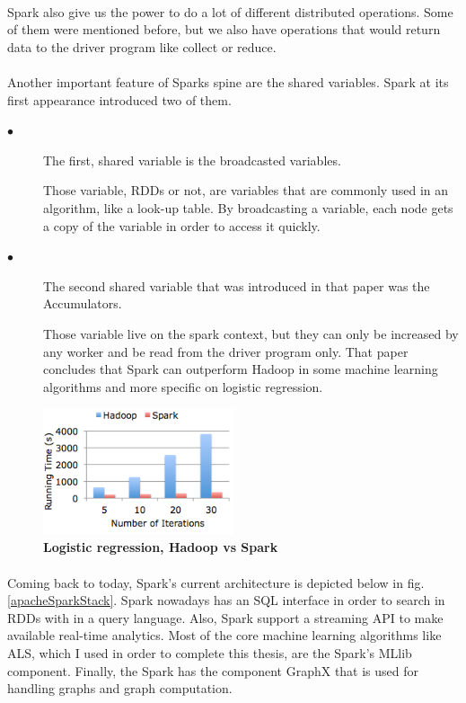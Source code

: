 \paragraph{}Spark also give us the power to do a lot of different distributed operations. Some of them were mentioned before, but we also have operations that would return data to the driver program like collect or reduce. 

\paragraph{}Another important feature of Sparks spine are the shared variables. Spark at its first appearance introduced two of them. 
\begin{description}
	\item[$\bullet$] The first, shared variable is the broadcasted variables. 
	
	Those variable, RDDs or not, are variables that are commonly used in an algorithm, like a look-up table. By broadcasting a variable, each node gets a copy of the variable in order to access it quickly. 
	
	\item[$\bullet$] The second shared variable that was introduced in that paper was the Accumulators. 
	
	Those variable live on the spark context, but they can only be increased by any worker and be read from the driver program only. That paper concludes that Spark can outperform Hadoop in some machine learning algorithms and more specific on logistic regression.
\end{description}

\begin{figure}[ht]
  \centering
    \includegraphics[width=0.5\textwidth]{images/hadoopVsSpark.png}
    \caption{\bfseries Logistic regression, Hadoop vs Spark \cite{HadoopVsSpark}}
   \label{hadoopVsSpark}
\end{figure}

\paragraph{}Coming back to today, Spark's current architecture is depicted below in fig. \ref{apacheSparkStack}. Spark nowadays has an SQL interface in order to search in RDDs with in a query language. Also, Spark support a streaming API to make available real-time analytics. Most of the core machine learning algorithms like ALS, which I used in order to complete this thesis, are the Spark's MLlib component. Finally, the Spark has the component GraphX that is used for handling graphs and graph computation.


